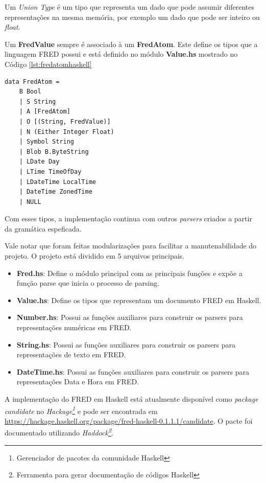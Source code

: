 Um \textit{Union Type} é um tipo que representa um dado que pode assumir diferentes 
representações na mesma memória, por exemplo um dado que pode ser inteiro ou \textit{float}.

Um \textbf{FredValue} sempre é associado à um \textbf{FredAtom}. Este
define os tipos que a linguagem FRED possui e está definido no módulo \textbf{Value.hs}
mostrado no Código \ref{lst:fredatomhaskell}

\begin{lstlisting}[caption=Definição do tipo FredAtom,label={lst:fredatomhaskell}]
data FredAtom =
    B Bool
    | S String
    | A [FredAtom]
    | O [(String, FredValue)]
    | N (Either Integer Float)
    | Symbol String
    | Blob B.ByteString
    | LDate Day
    | LTime TimeOfDay
    | LDateTime LocalTime
    | DateTime ZonedTime
    | NULL
\end{lstlisting}

Com esses tipos, a implementação continua com outros \textit{parsers} criados a partir da gramática
espeficada.

Vale notar que foram feitas modularizações para facilitar a manutenabilidade do projeto.
O projeto está dividido em 5 arquivos principais. 

\begin{itemize}
    \item \textbf{Fred.hs}: Define o módulo principal com as principais funções e expõe a 
    função parse que inicia o processo de parsing.
    \item \textbf{Value.hs}: Define os tipos que representam um documento FRED em Haskell.
    \item \textbf{Number.hs}: Possui as funções auxiliares para construir os parsers para
    representações numéricas em FRED.
    \item \textbf{String.hs}: Possui as funções auxiliares para construir os parsers para
    representações de texto em FRED.
    \item \textbf{DateTime.hs}: Possui as funções auxiliares para construir os parsers para
    representações Data e Hora em FRED.
\end{itemize}

A implementação do FRED em Haskell está atualmente disponível como \textit{package candidate} no 
\textit{Hackage\footnote{Gerenciador de pacotes da comunidade Haskell}} e pode ser encontrada
em \url{https://hackage.haskell.org/package/fred-haskell-0.1.1.1/candidate}. O pacte foi documentado utilizando 
\textit{Haddock\footnote{Ferramenta para gerar documentação de códigos Haskell}}.

